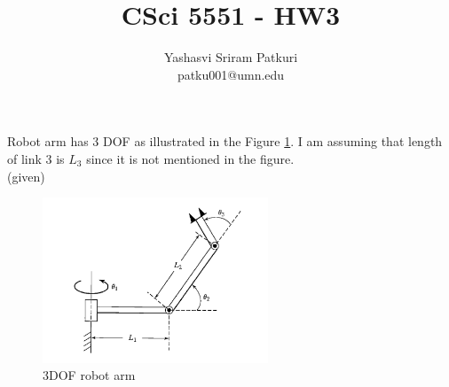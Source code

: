 \documentclass[12pt]{article}
\title{CSci 5551 - HW3}
\author{Yashasvi Sriram Patkuri\\patku001@umn.edu}
\newcommand{\given}{{\\ \color{blue} \hspace*{\fill}(given)} \\}
\begin{document}
\maketitle
\pagebreak

\section{}
Robot arm has 3 DOF as illustrated in the Figure \ref{fig:q1.1}.
I am assuming that length of link 3 is $L_3$ since it is not mentioned in the figure.
\given

\begin{figure}[h]
  \centering
  \includegraphics[width=0.6\textwidth]{q1.png}
  \caption{3DOF robot arm}
  \label{fig:q1.1}
\end{figure}
\end{document}
